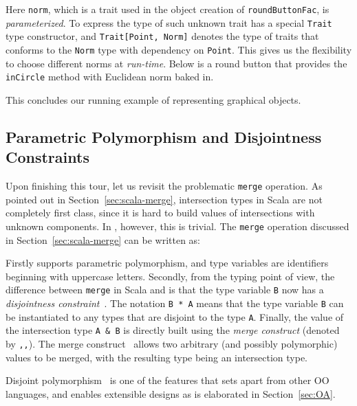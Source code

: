 \noindent Here \lstinline{norm}, which is a trait used in the object creation of
\lstinline{roundButtonFac}, is \emph{parameterized}. To express the
type of such unknown trait \name has a special 
\lstinline{Trait} type constructor, and \lstinline$Trait[Point, Norm]$
denotes the type of traits that conforms to the \lstinline$Norm$ type with dependency
on \lstinline{Point}. This gives us the
flexibility to choose different norms at \emph{run-time}. Below is a
round button that provides the \lstinline{inCircle} method with Euclidean norm baked
in.

This concludes our running example of representing graphical objects.

\subsection{Parametric Polymorphism and Disjointness Constraints}
\label{sec:merge-construct}

Upon finishing this tour, let us revisit the problematic \lstinline{merge}
operation. As pointed out in Section~\ref{sec:scala-merge}, intersection types
in Scala are not completely first class, since it is hard to build values of
intersections with unknown components. In \name, however, this is trivial. The
\lstinline{merge} operation discussed in Section~\ref{sec:scala-merge} can be written as:

\noindent Firstly \name supports parametric polymorphism, and type variables are
identifiers beginning with uppercase letters. Secondly, from the typing point of
view, the difference between \lstinline{merge} in Scala and \name is that the
type variable \lstinline{B} now has a \emph{disjointness
  constraint}~\cite{alpuimdisjoint}. The notation \lstinline{B * A} means that
the type variable \lstinline{B} can be instantiated to any types that are
disjoint to the type \lstinline{A}. Finally, the value of the intersection type
\lstinline{A & B} is directly built using the \textit{merge construct} (denoted
by \lstinline{,,}). The merge construct~\cite{dunfield2014elaborating} allows
two arbitrary (and possibly polymorphic) values to be merged, with the resulting type
being an intersection type.

Disjoint polymorphism~\cite{alpuimdisjoint} is one of the features
that sets \name apart
from other OO languages, and enables extensible designs as is elaborated in
Section~\ref{sec:OA}.

